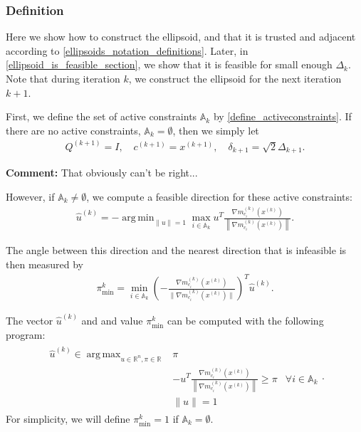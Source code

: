 \documentclass{article}
\newenvironment{comment}
  {\par\medskip
   \color{red}%
   \begin{framed}
   \textbf{Comment: }\ignorespaces}
 {\end{framed}
  \medskip}
\theoremstyle{case}
\numberwithin{theorem}{subsection}
\DeclareMathOperator*{\argmin}{arg\,min}
\DeclareMathOperator*{\argmax}{arg\,max}
\newcommand{\activeconstraintsk}{{\mathbb A_{k}}}
\newcommand{\dk}{\Delta_k}
\newcommand{\dkpo}{\Delta_{k+1}}
\newcommand{\gmcik}{{\nabla m_{c_i}^{(k)}\left(\xk\right)}}
\newcommand{\hgik}{{\frac{\nabla m^{(k)}_{c_i}(\xk)}{\|\nabla m^{(k)}_{c_i}\left(\xk\right)\|}}}
\newcommand{\huk}{{{\hat u}^{(k)}}}
\newcommand{\reals}{\mathbb R}
\newcommand{\Rn}{\mathbb R^n}
\newcommand{\thetamink}{{\pi^k_{\textrm{min}}}}
\newcommand{\xkpo}{{{x}^{(k+1)}}}
\newcommand{\xk}{x^{(k)}}
\newcommand{\zik}{{z^{(i, k)}}}
\newcommand{\qkpo}{{Q^{(k+1)}}}
\newcommand{\ckpo}{{c^{(k+1)}}}
\newcommand{\sdkpo}{{\delta_{k+1}}}
\begin{document}
\subsubsection{Definition}

Here we show how to construct the ellipsoid, and that it is 
trusted and adjacent
according to \cref{ellipsoids_notation_definitions}.
Later, in \cref{ellipsoid_is_feasible_section}, we show that it is feasible for small enough $\dk$.
Note that during iteration $k$, we construct the ellipsoid for the next iteration $k+1$.


First, we define the set of active constraints $\activeconstraintsk$ by \cref{define_activeconstraints}.
If there are no active constraints, $\activeconstraintsk = \emptyset$, then we simply let
\begin{align}
\qkpo = I, \quad \ckpo = \xkpo, \quad \sdkpo = \sqrt{2} \dkpo. \label{define_trivial_ellipsek}
\end{align}
\begin{comment}
That obviously can't be right...
\end{comment}

However, if $\activeconstraintsk \ne \emptyset$, we compute a feasible direction for these active constraints:
\begin{align}
\huk = -\argmin_{\|u\| = 1} \max_{i \in \activeconstraintsk} u^T \frac{\gmcik}{\left\|\gmcik\right\|}. \label{define_u}
\end{align}


The angle between this direction and the nearest direction that is infeasible is then measured by
\begin{align}
\thetamink = \min_{i \in \activeconstraintsk} \left(-\hgik\right)^T \huk \label{define_thetamink}.
\end{align}

The vector $\huk$ and and value $\thetamink$ can be computed with the following program:
\begin{align*}
\begin{array}{ccc}
\huk \in \argmax_{u\in\Rn, \pi \in\reals} & \pi \\
& -u^T \frac{\gmcik}{\left\|\gmcik\right\|} \ge \pi & \forall i \in \activeconstraintsk \\
& \|u \| = 1& 
\end{array}.
\end{align*}
For simplicity, we will define $\thetamink = 1$ if $\activeconstraintsk = \emptyset$.
\end{document}
